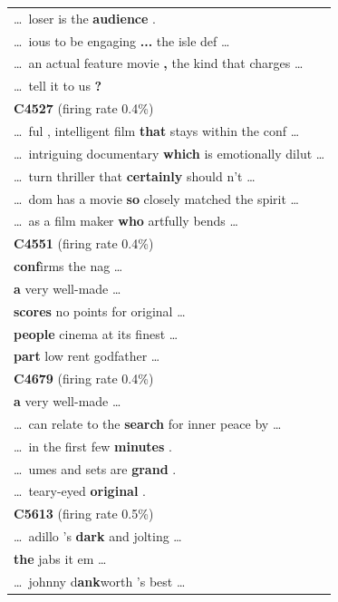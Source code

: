 \begin{longtable}{@{}>{\ttfamily}p{\linewidth}@{}}
    \dots\ loser is the\textbf{ audience} .\\
    \dots\ ious to be engaging\textbf{ ...} the isle def \dots\\
    \dots\ an actual feature movie\textbf{ ,} the kind that charges \dots\\
    \dots\ tell it to us\textbf{ ?} \\
    \addlinespace
    {\normalfont\textbf{C4527} \hfill (firing rate 0.4\%)}\\
    \cmidrule(){1-1}
    \dots\ ful , intelligent film\textbf{ that} stays within the conf \dots\\
    \dots\ intriguing documentary\textbf{ which} is emotionally dilut \dots\\
    \dots\ turn thriller that\textbf{ certainly} should n't \dots\\
    \dots\ dom has a movie\textbf{ so} closely matched the spirit \dots\\
    \dots\ as a film maker\textbf{ who} artfully bends \dots\\
    \addlinespace
    {\normalfont\textbf{C4551} \hfill (firing rate 0.4\%)}\\
    \cmidrule(){1-1}
    \textbf{conf}irms the nag \dots\\
    \textbf{a} very well-made \dots\\
    \textbf{scores} no points for original \dots\\
    \textbf{people} cinema at its finest \dots\\
    \textbf{part} low rent godfather \dots\\
    \addlinespace
    {\normalfont\textbf{C4679} \hfill (firing rate 0.4\%)}\\
    \cmidrule(){1-1}
    \textbf{a} very well-made \dots\\
    \dots\ can relate to the\textbf{ search} for inner peace by \dots\\
    \dots\ in the first few\textbf{ minutes} .\\
    \dots\ umes and sets are\textbf{ grand} .\\
    \dots\ teary-eyed\textbf{ original} .\\
    \addlinespace
    {\normalfont\textbf{C5613} \hfill (firing rate 0.5\%)}\\
    \cmidrule(){1-1}
    \dots\ adillo 's\textbf{ dark} and jolting \dots\\
    \textbf{the} jabs it em \dots\\
    \dots\ johnny d\textbf{ank}worth 's best \dots\\

\end{longtable}
